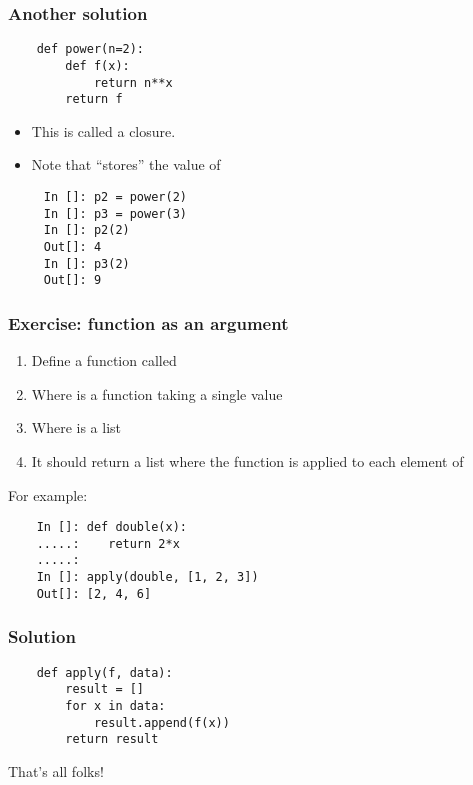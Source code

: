 \documentclass[14pt,compress]{beamer}
\begin{document}
\begin{frame}
  \frametitle{Another solution}
  \begin{lstlisting}
    def power(n=2):
        def f(x):
            return n**x
        return f
   \end{lstlisting}
   \begin{itemize}
   \item This is called a closure.
   \item Note that  ``stores'' the value of 
   \end{itemize}
   \pause
   \begin{lstlisting}
     In []: p2 = power(2)
     In []: p3 = power(3)
     In []: p2(2)
     Out[]: 4
     In []: p3(2)
     Out[]: 9
  \end{lstlisting}
\end{frame}

\begin{frame}
  \frametitle{Exercise: function as an argument}
  \begin{enumerate}
  \item Define a function called 
  \item Where  is a function taking a single value
  \item Where  is a list
  \item It should return a list where the function is applied to each element
    of 
  \end{enumerate}
  For example:
  \begin{lstlisting}
    In []: def double(x):
    .....:    return 2*x
    .....:
    In []: apply(double, [1, 2, 3])
    Out[]: [2, 4, 6]
  \end{lstlisting}
\end{frame}

\begin{frame}
  \frametitle{Solution}
  \begin{lstlisting}
    def apply(f, data):
        result = []
        for x in data:
            result.append(f(x))
        return result
  \end{lstlisting}
\end{frame}

\begin{frame}
  \centering
  \Huge

  That's all folks!
\end{frame}
\end{document}

